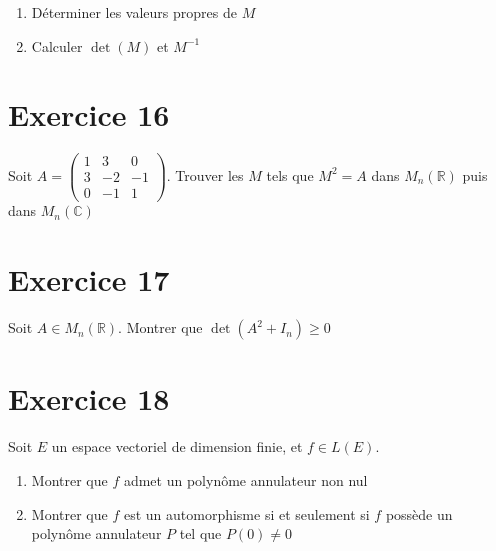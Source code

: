 \documentclass[11pt]{article}
\begin{document}
\begin{enumerate}
\item Déterminer les valeurs propres de $M$
\item Calculer $\det(M)$ et $M^{-1}$
\end{enumerate}

\section*{Exercice 16}

Soit $A=\begin{pmatrix}
1 & 3 & 0\\
3 & -2 & -1\\
0 & -1 & 1
\end{pmatrix}$.
Trouver les $M$ tels que $M^2=A$ dans $\textit{M}_n(\mathbb{R})$ puis dans $\textit{M}_n(\mathbb{C})$

\section*{Exercice 17}

Soit $A\in \textit{M}_n(\mathbb{R})$. Montrer que $\det(A^2 +I_n)\geq0$

\section*{Exercice 18}

Soit $E$ un espace vectoriel de dimension finie, et $f\in \textit{L}(E)$.
\begin{enumerate}
\item Montrer que $f$ admet un polynôme annulateur non nul
\item Montrer que $f$ est un automorphisme si et seulement si $f$ possède un polynôme annulateur $P$ tel que $P(0)\neq0$

\end{enumerate}
\end{document}
